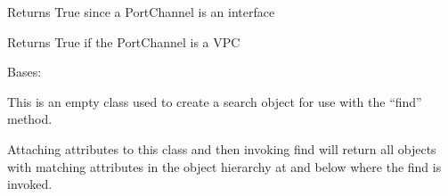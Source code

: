 \documentclass[letterpaper,10pt,english]{sphinxmanual}
\begin{document}
\begin{fulllineitems}
\begin{fulllineitems}
\end{fulllineitems}


\begin{fulllineitems}
\label{acitoolkit:acitoolkit.PortChannel.is_interface}
Returns True since a PortChannel is an interface

\end{fulllineitems}


\begin{fulllineitems}
\label{acitoolkit:acitoolkit.PortChannel.is_vpc}
Returns True if the PortChannel is a VPC

\end{fulllineitems}


\end{fulllineitems}


\begin{fulllineitems}
\label{acitoolkit:acitoolkit.Search}
Bases: {\hyperref[acibaseobject:acibaseobject.BaseACIObject]{}}

This is an empty class used to create a search object for use with the ``find'' method.

Attaching attributes to this class and then invoking find will return all objects with matching attributes
in the object hierarchy at and below where the find is invoked.

\end{fulllineitems}

\end{document}
